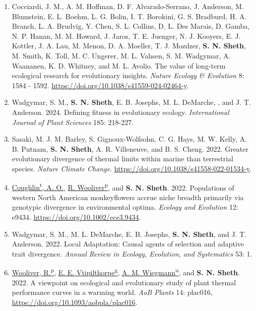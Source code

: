 \documentclass[11pt,english]{article}\usepackage[]{graphicx}\usepackage[]{xcolor}
\newcommand\reverselabel[1]{%
  \def\theenumi{}%
  \renewcommand\makelabel{\makebox[\dimexpr\labelwidth-3pt\relax][r]{%
    \the\numexpr#1-\value{enumi}+1\relax}}}%
\begin{document}
\begin{hangparas}{.5in}{1}
\begin{enumerate}
\reverselabel{32} %

\item Cocciardi, J. M., A. M. Hoffman, D. F. Alvarado-Serrano, J. Anderson, M. Blumstein, E. L. Boehm, L. G. Bolin, I. T. Borokini, G. S. Bradburd, H. A. Branch, L. A. Brudvig, Y. Chen, S. L. Collins, D. L. Des Marais, D. Gamba, N. P. Hanan, M. M. Howard, J. Jaros, T. E. Juenger, N. J. Kooyers, E. J. Kottler, J. A. Lau, M. Menon, D. A. Moeller, T. J. Mozdzer, \textbf{S. N. Sheth}, M. Smith, K. Toll, M. C. Ungerer, M. L. Vahsen, S. M. Wadgymar, A. Waananen, K. D. Whitney, and M. L. Avolio. The value of long-term ecological research for evolutionary insights. \emph{Nature Ecology \& Evolution} 8: 1584 - 1592. \url{https://doi.org/10.1038/s41559-024-02464-y}.

\item Wadgymar, S. M., \textbf{S. N. Sheth}, E. B. Josephs, M. L. DeMarche, , and J. T. Anderson. 2024. Defining fitness in evolutionary ecology. \emph{International Journal of Plant Sciences} 185: 218-227. %

\item Sasaki, M. J. M. Barley, S. Gignoux-Wolfsohn, C. G. Hays, M. W. Kelly, A. B. Putnam, \textbf{S. N. Sheth}, A. R. Villeneuve, and B. S. Cheng. 2022. Greater evolutionary divergence of thermal limits within marine than terrestrial species. \emph{Nature Climate Change}. \url{https://doi.org/10.1038/s41558-022-01534-y}.

\item \underline{Coughlin\textsuperscript{t}, A. O.}, \underline{R. Wooliver\textsuperscript{p}}, and \textbf{S. N. Sheth}. 2022. Populations of western North American monkeyflowers accrue niche breadth primarily via genotypic divergence in environmental optima. \emph{Ecology and Evolution} 12: e9434. \url{https://doi.org/10.1002/ece3.9434}. 

\item Wadgymar, S. M., M. L. DeMarche, E. B. Josephs, \textbf{S. N. Sheth}, and J. T. Anderson. 2022. Local Adaptation: Causal agents of selection and adaptive trait divergence. \emph{Annual Review in Ecology, Evolution, and Systematics} 53: 1. %

\item \underline{Wooliver, R.\textsuperscript{p}}, \underline{E. E. Vtipilthorpe\textsuperscript{g}}, \underline{A. M. Wiegmann\textsuperscript{u}}, and \textbf{S. N. Sheth}. 2022. A viewpoint on ecological and evolutionary study of plant thermal performance curves in a warming world. \emph{AoB Plants} 14: plac016, \url{https://doi.org/10.1093/aobpla/plac016}. 


\end{enumerate}
\end{hangparas}
\end{document}
